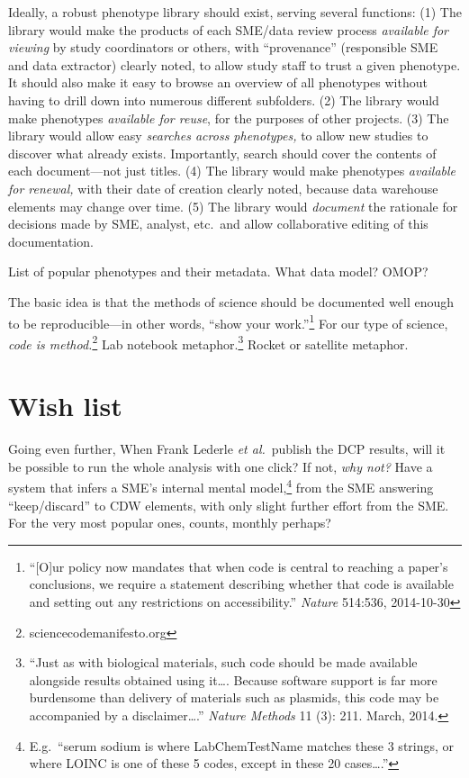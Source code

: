 \documentclass{tufte-handout}
\begin{document}
Ideally, a robust phenotype library should exist, serving several
functions: (1) The library would make the products of each SME/data
review process \emph{available for viewing} by study coordinators or
others, with ``provenance'' (responsible SME and data extractor)
clearly noted, to allow study staff to trust a given phenotype. It
should also make it easy to browse an overview of all phenotypes
without having to drill down into numerous different subfolders. (2)
The library would make phenotypes \emph{available for reuse}, for the
purposes of other projects. (3) The library would allow easy
\emph{searches across phenotypes,} to allow new studies to discover
what already exists. Importantly, search should cover the contents of
each document---not just titles. (4) The library would make phenotypes
\emph{available for renewal,} with their date of creation clearly
noted, because data warehouse elements may change over time. (5) The
library would \emph{document} the rationale for decisions made by SME,
analyst, etc.\ and allow collaborative editing of this documentation.



List of popular phenotypes and their metadata.  What data model? OMOP?


The basic idea is that the methods of science should be documented
well enough to be reproducible---in other words, ``show your
work.''\footnote{``[O]ur policy now mandates that when code is central
  to reaching a paper's conclusions, we require a statement describing
  whether that code is available and setting out any restrictions on
  accessibility.'' \emph{Nature} 514:536, 2014-10-30} For our type of
science, \emph{code is method.}\footnote{sciencecodemanifesto.org} Lab
notebook metaphor.\footnote{``Just as with biological materials, such
  code should be made available alongside results obtained using
  it\ldots{}. Because software support is far more burdensome than
  delivery of materials such as plasmids, this code may be accompanied
  by a disclaimer\ldots{}.'' \emph{Nature Methods} 11 (3): 211. March,
  2014.} Rocket or satellite metaphor.

\section{Wish list}

Going even further, When Frank Lederle \emph{et al.}\ publish the DCP
results, will it be possible to run the whole analysis with one click?
If not, \emph{why not?} Have a system that infers a SME's internal
mental model,\footnote{E.g.\ ``serum sodium is where LabChemTestName
  matches these 3 strings, or where LOINC is one of these 5 codes,
  except in these 20 cases\ldots{}.''} from the SME answering
``keep/discard'' to CDW elements, with only slight further effort from
the SME. For the very most popular ones, counts, monthly perhaps?
\end{document}
